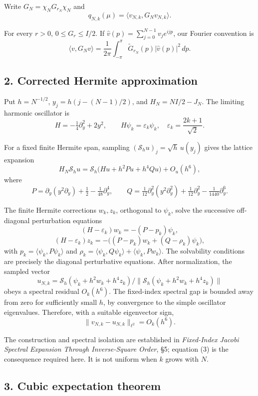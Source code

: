 \documentclass[
  10pt,
  a4paper,
]{article}
\begin{document}
Write \(G_N=\chi_NG_{r_N}\chi_N\) and \[
q_{N,k}(\mu)=\langle v_{N,k},G_Nv_{N,k}\rangle.
\]

For every \(r>0\), \(0\le G_r\le I/2\). If \(\widehat v(p)=\sum_{j=0}^{N-1}v_je^{ijp}\), our Fourier convention is \[
\langle v,G_Nv\rangle=\frac1{2\pi}\int_{-\pi}^{\pi}
\widetilde G_{r_N}(p)|\widehat v(p)|^2\,dp.
\tag{2}
\]

\subsection{2. Corrected Hermite approximation}\label{corrected-hermite-approximation}

Put \(h=N^{-1/2}\), \(y_j=h(j-(N-1)/2)\), and \(H_N=NI/2-J_N\). The limiting harmonic oscillator is \[
H=-\tfrac14\partial_y^2+2y^2,
\qquad H\psi_k=\varepsilon_k\psi_k,
\quad \varepsilon_k=\frac{2k+1}{\sqrt2}.
\]

For a fixed finite Hermite span, sampling \((\mathcal S_hu)_j=\sqrt h\,u(y_j)\) gives the lattice expansion \[
H_N\mathcal S_hu
=\mathcal S_h\bigl(Hu+h^2Pu+h^4Qu\bigr)+O_u(h^6),
\] where \[
P=\partial_y(y^2\partial_y)+\tfrac12-\tfrac1{48}\partial_y^4,
\qquad
Q=\tfrac1{12}\partial_y^2(y^2\partial_y^2)
+\tfrac1{12}\partial_y^2-\tfrac1{1440}\partial_y^6.
\]

The finite Hermite corrections \(w_k,z_k\), orthogonal to \(\psi_k\), solve the successive off-diagonal perturbation equations \[
(H-\varepsilon_k)w_k=-(P-p_k)\psi_k,
\] \[
(H-\varepsilon_k)z_k=-\bigl((P-p_k)w_k+(Q-\rho_k)\psi_k\bigr),
\] with \(p_k=\langle\psi_k,P\psi_k\rangle\) and \(\rho_k=\langle\psi_k,Q\psi_k\rangle+\langle\psi_k,Pw_k\rangle\). The solvability conditions are precisely the diagonal perturbative equations. After normalization, the sampled vector \[
u_{N,k}=\mathcal S_h(\psi_k+h^2w_k+h^4z_k)/\|\mathcal S_h(\psi_k+h^2w_k+h^4z_k)\|
\] obeys a spectral residual \(O_k(h^6)\). The fixed-index spectral gap is bounded away from zero for sufficiently small \(h\), by convergence to the simple oscillator eigenvalues. Therefore, with a suitable eigenvector sign, \[
\boxed{\|v_{N,k}-u_{N,k}\|_{\ell^2}=O_k(h^6).}
\tag{3}
\]

The construction and spectral isolation are established in \emph{Fixed-Index Jacobi Spectral Expansion Through Inverse-Square Order}, §5; equation (3) is the consequence required here. It is not uniform when \(k\) grows with \(N\).

\subsection{3. Cubic expectation theorem}\label{cubic-expectation-theorem}
\end{document}
